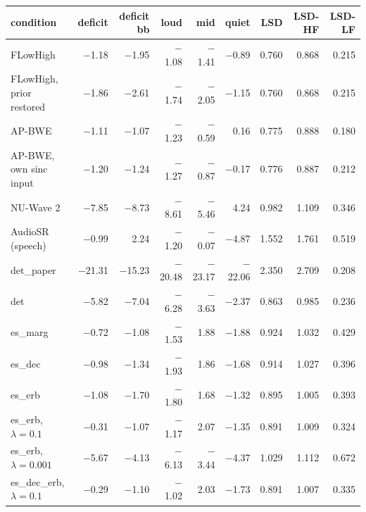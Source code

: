 \begin{tabular}{lrrrrrrrr}
\toprule
condition & deficit & deficit bb & loud & mid & quiet & LSD & LSD-HF & LSD-LF \\
\midrule
FLowHigh & $-$1.18 & $-$1.95 & $-$1.08 & $-$1.41 & $-$0.89 & 0.760 & 0.868 & 0.215 \\
FLowHigh, prior restored & $-$1.86 & $-$2.61 & $-$1.74 & $-$2.05 & $-$1.15 & 0.760 & 0.868 & 0.215 \\
AP-BWE & $-$1.11 & $-$1.07 & $-$1.23 & $-$0.59 & 0.16 & 0.775 & 0.888 & 0.180 \\
AP-BWE, own sinc input & $-$1.20 & $-$1.24 & $-$1.27 & $-$0.87 & $-$0.17 & 0.776 & 0.887 & 0.212 \\
NU-Wave 2 & $-$7.85 & $-$8.73 & $-$8.61 & $-$5.46 & 4.24 & 0.982 & 1.109 & 0.346 \\
AudioSR (speech) & $-$0.99 & 2.24 & $-$1.20 & $-$0.07 & $-$4.87 & 1.552 & 1.761 & 0.519 \\
det\_paper & $-$21.31 & $-$15.23 & $-$20.48 & $-$23.17 & $-$22.06 & 2.350 & 2.709 & 0.208 \\
det & $-$5.82 & $-$7.04 & $-$6.28 & $-$3.63 & $-$2.37 & 0.863 & 0.985 & 0.236 \\
es\_marg & $-$0.72 & $-$1.08 & $-$1.53 & 1.88 & $-$1.88 & 0.924 & 1.032 & 0.429 \\
es\_dec & $-$0.98 & $-$1.34 & $-$1.93 & 1.86 & $-$1.68 & 0.914 & 1.027 & 0.396 \\
es\_erb & $-$1.08 & $-$1.70 & $-$1.80 & 1.68 & $-$1.32 & 0.895 & 1.005 & 0.393 \\
es\_erb, $\lambda{=}0.1$ & $-$0.31 & $-$1.07 & $-$1.17 & 2.07 & $-$1.35 & 0.891 & 1.009 & 0.324 \\
es\_erb, $\lambda{=}0.001$ & $-$5.67 & $-$4.13 & $-$6.13 & $-$3.44 & $-$4.37 & 1.029 & 1.112 & 0.672 \\
es\_dec\_erb, $\lambda{=}0.1$ & $-$0.29 & $-$1.10 & $-$1.02 & 2.03 & $-$1.73 & 0.891 & 1.007 & 0.335 \\
\bottomrule
\end{tabular}
